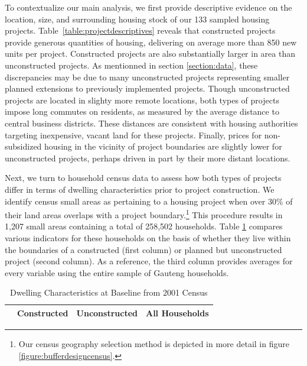 \documentclass[12pt]{article}
\begin{document}
To contextualize our main analysis, we first provide descriptive evidence on the location, size, and surrounding housing stock of our 133 sampled housing projects. Table~\ref{table:projectdescriptives} reveals that constructed projects provide generous quantities of housing, delivering on average more than 850 new units per project. Constructed projects are also substantially larger in area than unconstructed projects. As mentionned in section \ref{section:data}, these discrepancies may be due to many unconstructed projects representing smaller planned extensions to previously implemented projects. Though unconstructed projects are located in slighty more remote locations, both types of projects impose long commutes on residents, as measured by the average distance to central business districts. These distances are consistent with housing authorities targeting inexpensive, vacant land for these projects. Finally, prices for non-subsidized housing in the vicinity of project boundaries are slightly lower for unconstructed projects, perhaps driven in part by their more distant locations.

Next, we turn to household census data to assess how both types of projects differ in terms of dwelling characteristics prior to project construction. We identify census small areas as pertaining to a housing project when over 30\% of their land areas overlaps with a project boundary.\footnote{Our census geography selection method is depicted in more detail in figure \ref{figure:bufferdesigncensus}.} This procedure results in 1,207 small areas containing a total of 258,502 households. Table \ref{table:projectdescriptivescensus} compares various indicators for these households on the basis of whether they live within the boundaries of a constructed (first column) or planned but unconstructed project (second column). As a reference, the third column provides averages for every variable using the entire sample of Gauteng households. 

\begin{table}[t!]
	\centering
	\caption{Dwelling Characteristics at Baseline from 2001 Census}\label{table:projectdescriptivescensus}
\vspace{-2mm}
\begin{tabular}{l*{1}{ccc}}
\toprule
& Constructed & Unconstructed & All Households \\
\midrule
 
\bottomrule
\end{tabular}
\end{table}
\end{document}
